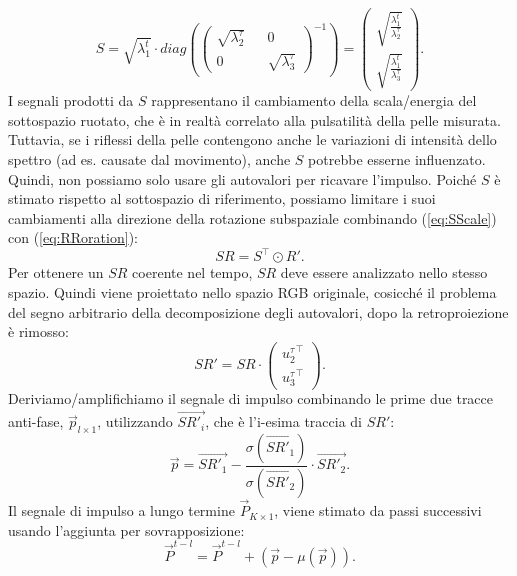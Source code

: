 \documentclass[journal,A4paper,compsoc,epsfig]{IEEEtran}
\begin{document}
      \begin{equation}
        S =
        \sqrt{\lambda^t_1} \cdot diag \left(
        \begin{pmatrix}        
          \sqrt{\lambda^{\tau}_2} && 0 \\
          0 && \sqrt{\lambda^{\tau}_3}
        \end{pmatrix}^{-1} \right) =
        \begin{pmatrix}
          \sqrt{\frac{\lambda^{t}_1}{\lambda^{\tau}_2}} \\
          \sqrt{\frac{\lambda^{t}_1}{\lambda^{\tau}_3}}
        \end{pmatrix}.
        \label{eq:SScale}
      \end{equation}
      I segnali prodotti da $S$ rappresentano il cambiamento della scala/energia del sottospazio ruotato, che è in realtà correlato alla pulsatilità della pelle misurata.
      Tuttavia, se i riflessi della pelle contengono anche le variazioni di intensità dello spettro (ad es. causate dal movimento), anche $S$ potrebbe esserne influenzato.
      Quindi, non possiamo solo usare gli autovalori per ricavare l'impulso.
      Poiché $S$ è stimato rispetto al sottospazio di riferimento, possiamo limitare i suoi cambiamenti alla direzione della rotazione subspaziale combinando (\ref{eq:SScale}) con (\ref{eq:RRoration}):
      \begin{equation}
        SR = S^{\top} \odot R'.
        \label{eq:SRScalingRotation}
      \end{equation}      
      Per ottenere un $SR$ coerente nel tempo, $SR$ deve essere analizzato nello stesso spazio. Quindi viene proiettato nello spazio RGB originale, cosicché il problema del segno arbitrario della decomposizione degli autovalori, dopo la retroproiezione è rimosso:
      \begin{equation}
        SR' = SR \cdot
        \begin{pmatrix}
          {u^{\tau}_2}^{\top} \\
          {u^{\tau}_3}^{\top}
        \end{pmatrix}.
        \label{eq:CoherentSR}
      \end{equation}      
      Deriviamo/amplifichiamo il segnale di impulso combinando le prime due tracce anti-fase, $\vec{p}_{l \times 1}$, utilizzando $\vec{SR'_i}$, che è l'i-esima traccia di $SR'$:
      \begin{equation}
        \vec{p} = \vec{SR'_1} - \frac{\sigma(\vec{SR'_1})}{\sigma(\vec{SR'_2})} \cdot \vec{SR'_2}.
        \label{eq:pPulseSignal}
      \end{equation}
      Il segnale di impulso a lungo termine $\vec{P}_{K \times 1}$, viene stimato da passi successivi usando l'aggiunta per sovrapposizione:      
      \begin{equation}
        \vec{P}^{t - l} = \vec{P}^{t - l} + (\vec{p} - \mu(\vec{p})).
        \label{eq:LongTermPulseSignal}
      \end{equation}
      
\end{document}
